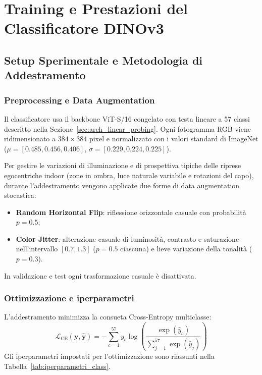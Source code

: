 \chapter{Training e Prestazioni del Classificatore DINOv3}
\label{chap:training_classificatore}

\section{Setup Sperimentale e Metodologia di Addestramento}
\label{sec:class_setup}

\subsection{Preprocessing e Data Augmentation}
Il classificatore usa il backbone ViT-S/16 congelato con testa lineare a 57 classi descritto nella Sezione~\ref{sec:arch_linear_probing}. Ogni fotogramma RGB viene ridimensionato a $384 \times 384$ pixel e normalizzato con i valori standard di ImageNet ($\mu = [0.485, 0.456, 0.406]$, $\sigma = [0.229, 0.224, 0.225]$).

Per gestire le variazioni di illuminazione e di prospettiva tipiche delle riprese egocentriche indoor (zone in ombra, luce naturale variabile e rotazioni del capo), durante l'addestramento vengono applicate due forme di data augmentation stocastica:
\begin{itemize}
    \item \textbf{Random Horizontal Flip}: riflessione orizzontale casuale con probabilità $p = 0.5$;
    \item \textbf{Color Jitter}: alterazione casuale di luminosità, contrasto e saturazione nell'intervallo $[0.7, 1.3]$ ($p = 0.5$ ciascuna) e lieve variazione della tonalità ($p = 0.3$).
\end{itemize}
In validazione e test ogni trasformazione casuale è disattivata.

\subsection{Ottimizzazione e iperparametri}
L'addestramento minimizza la consueta Cross-Entropy multiclasse:
\begin{equation}
    \mathcal{L}_{\text{CE}}(\mathbf{y}, \hat{\mathbf{y}}) = - \sum_{c=1}^{57} y_c \log \left( \frac{\exp(\hat{y}_c)}{\sum_{j=1}^{57} \exp(\hat{y}_j)} \right)
\end{equation}
Gli iperparametri impostati per l'ottimizzazione sono riassunti nella Tabella~\ref{tab:iperparametri_class}.

